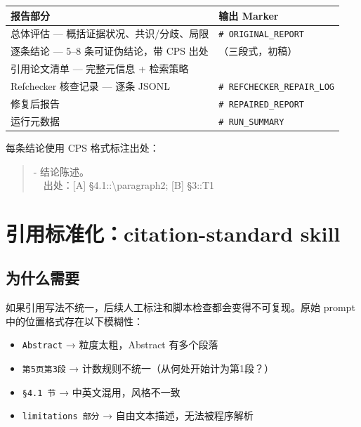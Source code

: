\documentclass[UTF8,fontset=fandol,a4paper,12pt]{ctexart}
\begin{document}
\begin{center}
\begin{tabular}{p{5cm}|p{5cm}}
  \toprule
  \textbf{报告部分} & \textbf{输出 Marker} \\
  \midrule
  总体评估 — 概括证据状况、共识/分歧、局限 & \texttt{\# ORIGINAL\_REPORT} \\
  逐条结论 — 5--8 条可证伪结论，带 CPS 出处 & （三段式，初稿） \\
  引用论文清单 — 完整元信息 + 检索策略 & \\
  \midrule
  Refchecker 核查记录 — 逐条 JSONL & \texttt{\# REFCHECKER\_REPAIR\_LOG} \\
  修复后报告 & \texttt{\# REPAIRED\_REPORT} \\
  运行元数据 & \texttt{\# RUN\_SUMMARY} \\
  \bottomrule
\end{tabular}
\end{center}

每条结论使用 CPS 格式标注出处：
\begin{quote}\ttfamily\small
- 结论陈述。\\
\ \ 出处：[A] \S4.1::\textbackslash paragraph2; [B] \S3::T1
\end{quote}

\section{引用标准化：citation-standard skill}

\subsection{为什么需要}

如果引用写法不统一，后续人工标注和脚本检查都会变得不可复现。原始 prompt 中的位置格式存在以下模糊性：

\begin{itemize}[nosep]
  \item \texttt{Abstract} → 粒度太粗，Abstract 有多个段落
  \item \texttt{第5页第3段} → 计数规则不统一（从何处开始计为第1段？）
  \item \texttt{\S4.1 节} → 中英文混用，风格不一致
  \item \texttt{limitations 部分} → 自由文本描述，无法被程序解析
\end{itemize}
\end{document}
